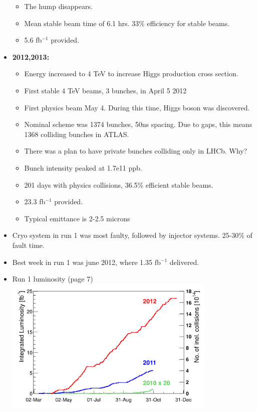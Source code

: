 \begin{itemize}
\begin{itemize}
        \item The hump disappears. \cite{lhcRun1}
        \item Mean stable beam time of 6.1 hrs. 33\% efficiency for stable beams. \cite{lhcRun1}
        \item 5.6 fb$^{-1}$ provided. \cite{lhcRun1}
    \end{itemize}
    \item \textbf{2012,2013:} \cite{lhcRun1}
    \begin{itemize}
        \item Energy increased to 4 TeV to increase Higgs production cross section. \cite{lhcRun1}
        \item First stable 4 TeV beams, 3 bunches, in April 5 2012 \cite{lhcRun1}
        \item First physics beam May 4. During this time, Higgs boson was discovered. \cite{lhcRun1}
        \item Nominal scheme was 1374 bunches, 50ns spacing. Due to gaps, this means 1368 colliding bunches in ATLAS. \cite{lhcRun1}
        \item There was a plan to have private bunches colliding only in LHCb. {\color{blue}Why?} \cite{lhcRun1}
        \item Bunch intensity peaked at 1.7e11 ppb. \cite{lhcRun1}
        \item 201 days with physics collisions, 36.5\% efficient stable beams. \cite{lhcRun1}
        \item 23.3 fb$^{-1}$ provided. \cite{lhcRun1}
        \item Typical emittance is 2-2.5 microns \cite{lhcRun1}
    \end{itemize}
    \item Cryo system in run 1 was most faulty, followed by injector systems. 25-30\% of fault time. \cite{lhcRun1}
    \item Best week in run 1 was june 2012, where 1.35 fb$^{-1}$ delivered. \cite{lhcRun1}
    \item Run 1 luminosity (page 7)\\ \cite{lhcRun1}
    \includegraphics[width=0.8\textwidth]{figures/notes-experiment/run1Lumi.png}

\end{itemize}

